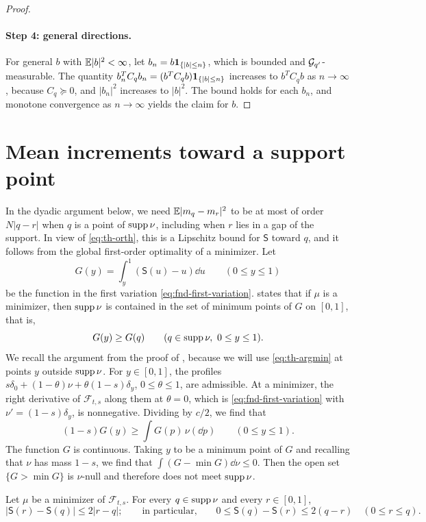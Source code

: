 \begin{proof}
\paragraph{Step 4: general directions.}
For general $b$ with $\mathbb E|b|^2<\infty$, let $b_n=b\mathbf1_{\{|b|\le n\}}$,
which is bounded and $\mathcal G_{q'}$-measurable. The quantity
$b_n^TC_qb_n=(b^TC_qb)\mathbf1_{\{|b|\le n\}}$ increases to $b^TC_qb$ as
$n\to\infty$, because $C_q\succeq0$, and $|b_n|^2$ increases to
$|b|^2$. The bound holds for each $b_n$, and monotone convergence as
$n\to\infty$ yields the claim for $b$.
\end{proof}

\section{Mean increments toward a support point}\label{sec:th-support}

In the dyadic argument below, we need $\mathbb E|m_q-m_r|^2$ to be at most of
order $N|q-r|$ when $q$ is a point of $\operatorname{supp}\nu$, including when $r$
lies in a gap of the support. In view of \eqref{eq:th-orth}, this is a
Lipschitz bound for $\mathsf S$ toward $q$, and it follows from the global
first-order optimality of a minimizer. Let
\[
 G(y)=\int_y^1(\mathsf S(u)-u)\dd u\qquad(0\le y\le1)
\]
be the function in the first variation \eqref{eq:fnd-first-variation}.
 states that if $\mu$ is a minimizer, then
$\operatorname{supp}\nu$ is contained in the set of minimum points of $G$ on $[0,1]$,
that is,
\begin{equation}\label{eq:th-argmin}
 G(y)\ge G(q)\qquad(q\in\operatorname{supp}\nu,\ 0\le y\le1).
\end{equation}
We recall the argument from the proof of \cite[Proposition~2.1]{AL},
because we will use \eqref{eq:th-argmin} at points $y$ outside
$\operatorname{supp}\nu$. For $y\in[0,1]$, the profiles
$s\delta_0+(1-\theta)\nu+\theta(1-s)\delta_y$, $0\le\theta\le1$, are
admissible. At a minimizer, the right derivative of $\mathcal F_{t,s}$
along them at $\theta=0$, which is \eqref{eq:fnd-first-variation} with
$\nu'=(1-s)\delta_y$, is nonnegative. Dividing by $c/2$, we
find that
\[
 (1-s)G(y)\ge\int G(p)\,\nu(\dd p)\qquad(0\le y\le1).
\]
The function $G$ is continuous. Taking $y$ to be a minimum point of $G$
and recalling that $\nu$ has mass $1-s$, we find that
$\int(G-\min G)\dd\nu\le0$. Then the open set $\{G>\min G\}$ is
$\nu$-null and therefore does not meet $\operatorname{supp}\nu$.

\begin{lemma}\label{lem:th-gamma}
Let $\mu$ be a minimizer of $\mathcal F_{t,s}$. For every $q\in\operatorname{supp}\nu$
and every $r\in[0,1]$,
\[
 |\mathsf S(r)-\mathsf S(q)|\le2|r-q|;\qquad\text{in particular,}\qquad
 0\le\mathsf S(q)-\mathsf S(r)\le2(q-r)\quad(0\le r\le q).
\]
\end{lemma}

